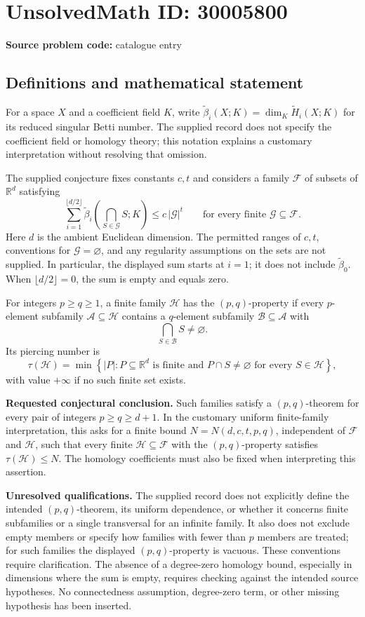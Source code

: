 \documentclass[11pt]{article}
\newcommand{\R}{\mathbb{R}}
\begin{document}
\section*{UnsolvedMath ID: 30005800}
\textbf{Source problem code:} catalogue entry
\subsection{Definitions and mathematical statement}
For a space \(X\) and a coefficient field \(K\), write \(\widetilde\beta_i(X;K)=\dim_K\widetilde H_i(X;K)\) for its reduced singular Betti number. The supplied record does not specify the coefficient field or homology theory; this notation explains a customary interpretation without resolving that omission.

The supplied conjecture fixes constants \(c,t\) and considers a family \(\mathcal F\) of subsets of \(\R^d\) satisfying
\[
\sum_{i=1}^{\lfloor d/2\rfloor}\widetilde\beta_i\!\left(\bigcap_{S\in\mathcal G}S;K\right)\leq c\,|\mathcal G|^t
\qquad\text{for every finite }\mathcal G\subseteq\mathcal F.
\]
Here \(d\) is the ambient Euclidean dimension. The permitted ranges of \(c,t\), conventions for \(\mathcal G=\varnothing\), and any regularity assumptions on the sets are not supplied. In particular, the displayed sum starts at \(i=1\); it does not include \(\widetilde\beta_0\). When \(\lfloor d/2\rfloor=0\), the sum is empty and equals zero.

For integers \(p\geq q\geq1\), a finite family \(\mathcal H\) has the \((p,q)\)-property if every \(p\)-element subfamily \(\mathcal A\subseteq\mathcal H\) contains a \(q\)-element subfamily \(\mathcal B\subseteq\mathcal A\) with
\[
\bigcap_{S\in\mathcal B}S\neq\varnothing.
\]
Its piercing number is
\[
\tau(\mathcal H)=\min\left\{|P|:P\subseteq\R^d\text{ is finite and }P\cap S\neq\varnothing\text{ for every }S\in\mathcal H\right\},
\]
with value \(+\infty\) if no such finite set exists.

\textbf{Requested conjectural conclusion.} Such families satisfy a \((p,q)\)-theorem for every pair of integers \(p\geq q\geq d+1\). In the customary uniform finite-family interpretation, this asks for a finite bound \(N=N(d,c,t,p,q)\), independent of \(\mathcal F\) and \(\mathcal H\), such that every finite \(\mathcal H\subseteq\mathcal F\) with the \((p,q)\)-property satisfies \(\tau(\mathcal H)\leq N\). The homology coefficients must also be fixed when interpreting this assertion.

\textbf{Unresolved qualifications.} The supplied record does not explicitly define the intended \((p,q)\)-theorem, its uniform dependence, or whether it concerns finite subfamilies or a single transversal for an infinite family. It also does not exclude empty members or specify how families with fewer than \(p\) members are treated; for such families the displayed \((p,q)\)-property is vacuous. These conventions require clarification. The absence of a degree-zero homology bound, especially in dimensions where the sum is empty, requires checking against the intended source hypotheses. No connectedness assumption, degree-zero term, or other missing hypothesis has been inserted.
\end{document}
